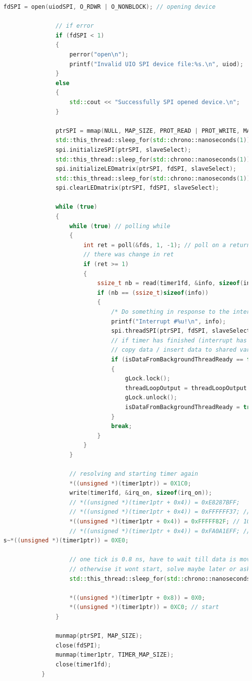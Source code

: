 \documentclass[a4paper, twoside, 11pt]{article}
\begin{document}
\begin{lstlisting}[language={c++}, caption={threadLoop() funkce, běžící ve vlákně backgroundThread.}, label={lst:thread-loop-code}]
			   fdSPI = open(uiodSPI, O_RDWR | O_NONBLOCK); // opening device
		   
			   // if error
			   if (fdSPI < 1)
			   {
				   perror("open\n");
				   printf("Invalid UIO SPI device file:%s.\n", uiod);
			   }
			   else
			   {
				   std::cout << "Successfully SPI opened device.\n";
			   }
		   
			   ptrSPI = mmap(NULL, MAP_SIZE, PROT_READ | PROT_WRITE, MAP_SHARED, fdSPI, 0);
			   std::this_thread::sleep_for(std::chrono::nanoseconds(1));
			   spi.initializeSPI(ptrSPI, slaveSelect);
			   std::this_thread::sleep_for(std::chrono::nanoseconds(1));
			   spi.initializeLEDmatrix(ptrSPI, fdSPI, slaveSelect);
			   std::this_thread::sleep_for(std::chrono::nanoseconds(1));
			   spi.clearLEDmatrix(ptrSPI, fdSPI, slaveSelect);
		   
			   while (true)
			   {
				   while (true) // polling while
				   {
					   int ret = poll(&fds, 1, -1); // poll on a return value
					   // there was change in ret
					   if (ret >= 1)
					   {
						   ssize_t nb = read(timer1fd, &info, sizeof(info));
						   if (nb == (ssize_t)sizeof(info))
						   {
							   /* Do something in response to the interrupt. */
							   printf("Interrupt #%u!\n", info);
							   spi.threadSPI(ptrSPI, fdSPI, slaveSelect);
							   // if timer has finished (interrupt has risen)
							   // copy data / insert data to shared variable
							   if (isDataFromBackgroundThreadReady == false)
							   {
								   gLock.lock();                            // mutex locking - any other thread can't access this variable (think it cannot write or read)
								   threadLoopOutput = threadLoopOutput + 1; // edit the shared variable
								   gLock.unlock();                          // mutex unlock
								   isDataFromBackgroundThreadReady = true;  // flag to main while loop that new data is present
							   }
							   break;
						   }
					   }
				   }
		   
				   // resolving and starting timer again
				   *((unsigned *)(timer1ptr)) = 0X1C0;
				   write(timer1fd, &irq_on, sizeof(irq_on));
				   // *((unsigned *)(timer1ptr + 0x4)) = 0xE8287BFF;
				   // *((unsigned *)(timer1ptr + 0x4)) = 0xFFFFFF37; // 1 us
				   *((unsigned *)(timer1ptr + 0x4)) = 0xFFFFF82F; // 10 us
				   // *((unsigned *)(timer1ptr + 0x4)) = 0xFA0A1EFF; // 0.5
s~*((unsigned *)(timer1ptr)) = 0XE0;
		   
				   // one tick is 0.8 ns, have to wait till data is moved to counter register
				   // otherwise it wont start, solve maybe later or ask about it
				   std::this_thread::sleep_for(std::chrono::nanoseconds(1));

				   *((unsigned *)(timer1ptr + 0x8)) = 0X0;
				   *((unsigned *)(timer1ptr)) = 0XC0; // start
			   }
		   
			   munmap(ptrSPI, MAP_SIZE);
			   close(fdSPI);
			   munmap(timer1ptr, TIMER_MAP_SIZE);
			   close(timer1fd);
		   }\end{lstlisting}
\end{document}
